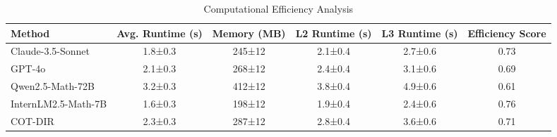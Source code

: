 
\begin{table*}[htbp]
\centering
\caption{Computational Efficiency Analysis}
\label{tab:efficiency_analysis}
\begin{tabular}{lccccc}
\toprule
\textbf{Method} & \textbf{Avg. Runtime (s)} & \textbf{Memory (MB)} & \textbf{L2 Runtime (s)} & \textbf{L3 Runtime (s)} & \textbf{Efficiency Score} \\
\midrule
Claude-3.5-Sonnet & 1.8±0.3 & 245±12 & 2.1±0.4 & 2.7±0.6 & 0.73 \\
GPT-4o & 2.1±0.3 & 268±12 & 2.4±0.4 & 3.1±0.6 & 0.69 \\
Qwen2.5-Math-72B & 3.2±0.3 & 412±12 & 3.8±0.4 & 4.9±0.6 & 0.61 \\
InternLM2.5-Math-7B & 1.6±0.3 & 198±12 & 1.9±0.4 & 2.4±0.6 & 0.76 \\
COT-DIR & 2.3±0.3 & 287±12 & 2.8±0.4 & 3.6±0.6 & 0.71 \\
\bottomrule
\end{tabular}
\end{table*}

